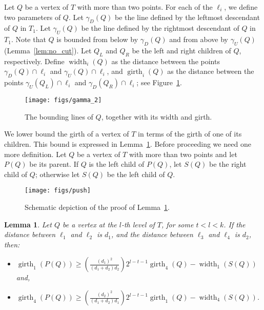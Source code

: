 \documentclass{article}
\newtheorem{lemma}[theorem]{Lemma}
\begin{document}
Let $Q$ be a vertex of $T$ with more than two points.
For each of the $\ell_i$,
we define two parameters of $Q$.
Let $\gamma_D(Q)$ be the line defined by the leftmost descendant
of $Q$ in $T_1$. Let $\gamma_U(Q)$ be the line defined by the rightmost descendant
of $Q$ in $T_1$. Note that $Q$ is bounded from below by $\gamma_D(Q)$ and from above by
$\gamma_U(Q)$ (Lemma~\ref{lem:no_cut}). Let $Q_L$ and $Q_R$ be the left and right children of $Q$, respectively.
Define $\operatorname{width}_i(Q)$ as the distance
between the points $\gamma_D(Q) \cap \ell_i$ and $\gamma_U(Q) \cap \ell_i$, and 
$\operatorname{girth}_i(Q)$ as the distance between the points 
$\gamma_U(Q_L) \cap \ell_i$ and $\gamma_D(Q_R) \cap \ell_i$; see Figure~\ref{fig:width_girth}. 

\begin{figure}
   \centering
\texttt{[image: figs/gamma\_2]}
\caption{The bounding lines of $Q$, together with its width and girth.}
	\label{fig:width_girth}
\end{figure}


We lower bound the girth of a vertex of $T$ in terms
of the girth of one of its children. This bound is expressed in Lemma~\ref{lem:lower_bound}.
Before proceeding we need one more definition. Let $Q$ be a vertex of $T$ with more than two points and let $P(Q)$ be its parent. 
If $Q$ is the left child of $P(Q)$, let $S(Q)$ be the right child of $Q$; otherwise let $S(Q)$ be the
left child of $Q$.

\begin{figure}
\begin{center}
\texttt{[image: figs/push]}
\end{center}
\caption{Schematic depiction of the proof of Lemma~\ref{lem:lower_bound}.}
\label{fig:push}
\end{figure}


\begin{lemma}
\label{lem:lower_bound}
  Let $Q$ be a vertex at the $l$-th level of $T$, for some $t< l< k$.
   If the distance between $\ell_1$ and
  $\ell_{2}$ is $d_1$, and the distance between $\ell_{3}$ and
  $\ell_{4}$ is $d_2$, then:

\begin{itemize}
  \item[(1)] $\operatorname{girth}_1(P(Q)) \geq  \left( \frac{(d_1)^2}{(d_1+d_2)d_2} \right ) 2^{l-t-1} \operatorname{girth}_4(Q)-\operatorname{width}_1(S(Q))$ and,
  
  \item[(2)] $\operatorname{girth}_4(P(Q)) \geq  \left( \frac{(d_2)^2}{(d_1+d_2)d_1} \right ) 2^{l-t-1} \operatorname{girth}_1(Q)-\operatorname{width}_4(S(Q))$.

\end{itemize}

\end{lemma}
\end{document}
